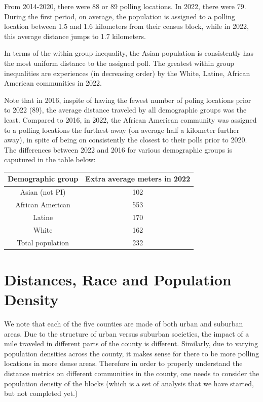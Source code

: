 \documentclass[11pt]{article}
\theoremstyle{remark}
\theoremstyle{definition}
\begin{document}
From 2014-2020, there were 88 or 89 polling locations. In 2022, there were 79. During the first period, on average, the population is assigned to a polling location between 1.5 and 1.6 kilometers from their census block, while in 2022, this average distance jumps to 1.7 kilometers. 

In terms of the within group inequality, the Asian population is consistently has the most uniform distance to the assigned poll. The greatest within group inequalities are experiences (in decreasing order) by the White, Latine, African American communities in 2022.

Note that in 2016, inspite of having the fewest number of poling locations prior to 2022 (89), the average distance traveled by all demographic groups was the least. Compared to 2016, in 2022, the African American community was assigned to a polling locations the furthest away (on average half a kilometer further away), in spite of being on consistently the closest to their polls prior to 2020. The differences between 2022 and 2016 for various demographic groups is caputured in the table below:

\begin{tabular}{|c|c|}
	\hline
	Demographic group & Extra average meters in 2022 \\ \hline
	Asian (not PI) &   102 \\ \hline
	African American &   553  \\ \hline
	Latine & 170 \\ \hline
	White &  162\\ \hline
	Total population &  232\\ \hline
\end{tabular}

\section{Distances, Race and Population Density}
We note that each of the five counties are made of both urban and suburban areas. Due to the structure of urban versus suburban societies, the impact of a mile traveled in different parts of the county is different. Similarly, due to varying population densities across the county, it makes sense for there to be more polling locations in more dense areas. Therefore in order to properly understand the distance metrics on different communities in the county, one needs to consider the population density of the blocks (which is a set of analysis that we have started, but not completed yet.)
\end{document}
